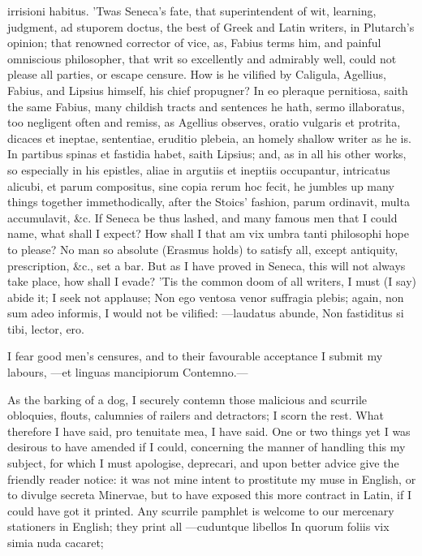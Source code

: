 {irrisioni habitus. 'Twas Seneca's fate, that superintendent of
wit, learning, judgment, ad stuporem doctus, the best of Greek and
Latin writers, in Plutarch's opinion; that renowned corrector of vice,
as, Fabius terms him, and painful omniscious philosopher, that
writ so excellently and admirably well, could not please all parties,
or escape censure. How is he vilified by  Caligula, Agellius,
Fabius, and Lipsius himself, his chief propugner? In eo pleraque
pernitiosa, saith the same Fabius, many childish tracts and sentences
he hath, sermo illaboratus, too negligent often and remiss, as Agellius
observes, oratio vulgaris et protrita, dicaces et ineptae, sententiae,
eruditio plebeia, an homely shallow writer as he is. In partibus spinas
et fastidia habet, saith Lipsius; and, as in all his other works,
so especially in his epistles, aliae in argutiis et ineptiis
occupantur, intricatus alicubi, et parum compositus, sine copia rerum
hoc fecit, he jumbles up many things together immethodically, after the
Stoics' fashion, parum ordinavit, multa accumulavit, \&c. If Seneca be
thus lashed, and many famous men that I could name, what shall I
expect? How shall I that am vix umbra tanti philosophi hope to please?
No man so absolute (Erasmus holds) to satisfy all, except
antiquity, prescription, \&c., set a bar. But as I have proved in
Seneca, this will not always take place, how shall I evade? 'Tis the
common doom of all writers, I must (I say) abide it; I seek not
applause; Non ego ventosa venor suffragia plebis; again, non sum
adeo informis, I would not be vilified:
---laudatus abunde,
Non fastiditus si tibi, lector, ero.

I fear good men's censures, and to their favourable acceptance I submit
my labours,
---et linguas mancipiorum
Contemno.---

As the barking of a dog, I securely contemn those malicious and
scurrile obloquies, flouts, calumnies of railers and detractors; I
scorn the rest. What therefore I have said, pro tenuitate mea, I have
said.
One or two things yet I was desirous to have amended if I could,
concerning the manner of handling this my subject, for which I must
apologise, deprecari, and upon better advice give the friendly reader
notice: it was not mine intent to prostitute my muse in English, or to
divulge secreta Minervae, but to have exposed this more contract in
Latin, if I could have got it printed. Any scurrile pamphlet is welcome
to our mercenary stationers in English; they print all
---cuduntque libellos
In quorum foliis vix simia nuda cacaret;

}
